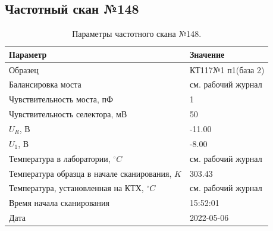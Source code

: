 \subsection{Частотный скан №148}
\begin{table}[!ht]
    \centering
    \caption{Параметры частотного скана №148.}
    \begin{tabular}{|l|l|}
        \hline
        Параметр                                       & Значение                  \\ \hline
        Образец                                        & КТ117№1 п1(база 2)        \\ \hline
        Балансировка моста                             & см. рабочий журнал        \\ \hline
        Чувствительность моста, пФ                     & 1                         \\ \hline
        Чувствительность селектора, мВ                 & 50                        \\ \hline
        $U_R$, В                                       & -11.00                    \\ \hline
        $U_1$, В                                       & -8.00                     \\ \hline
        Температура в лаборатории, $^\circ C$          & см. рабочий журнал        \\ \hline
        Температура образца в начале сканирования, $K$ & 303.43                    \\ \hline
        Температура, установленная на КТХ, $^\circ C$  & см. рабочий журнал        \\ \hline
        Время начала сканирования                      & 15:52:01                  \\ \hline
        Дата                                           & 2022-05-06                \\ \hline
    \end{tabular}
    \label{table:frequency_scan_148}
\end{table}

